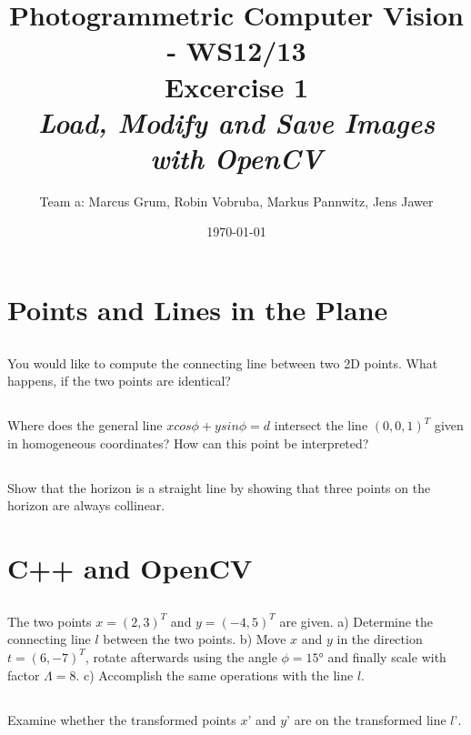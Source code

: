 \documentclass[a4paper,headings=small]{scrartcl}
\title{Photogrammetric Computer Vision - WS12/13 \\ Excercise 1 \\ \emph{Load, Modify and Save Images with OpenCV}}
\author{Team a: Marcus Grum, Robin Vobruba, Markus Pannwitz, Jens Jawer}
\date{\today}
\numberwithin{equation}{section} %
\numberwithin{figure}{section}   %
\begin{document}
\maketitle



\section{Points and Lines in the Plane}


\subsection{}

You would like to compute the connecting line between two 2D points. \newline
What happens, if the two points are identical? \newline





\subsection{}

Where does the general line $ x cos \phi + y sin \phi = d$ intersect the line $(0, 0, 1)^T$
given in homogeneous coordinates? \newline
How can this point be interpreted? \newline


\subsection{}

Show that the horizon is a straight line by showing that three points
on the horizon are always collinear. \newline


\section{C++ and OpenCV}


\subsection{}

The two points $x = (2, 3)^T$ and $y = (-4, 5)^T$ are given. \newline
a) Determine the connecting line $l$ between the two points. \newline
b) Move $x$ and $y$ in the direction $t = (6, -7)^T$,
rotate afterwards using the angle $\phi = 15°$ and finally
scale with factor $\Lambda = 8$. \newline
c) Accomplish the same operations with the line $l$. \newline






\subsection{}

Examine whether the transformed points $x’$ and $y’$ are
on the transformed line $l’$. \newline
\end{document}
